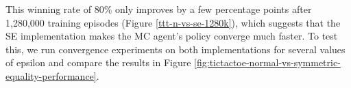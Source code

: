 \documentclass[11pt,a4paper]{report}
\begin{document}
This winning rate of 80\% only improves by a few percentage points after 1,280,000 training episodes (Figure \ref{ttt-n-vs-se-1280k}), which suggests that the SE implementation makes the MC agent's policy converge much faster. To test this, we run convergence experiments on both implementations for several values of epsilon and compare the results in Figure \ref{fig:tictactoe-normal-vs-symmetric-equality-performance}.

\begin{figure}
    \centering


\end{figure}
\end{document}
